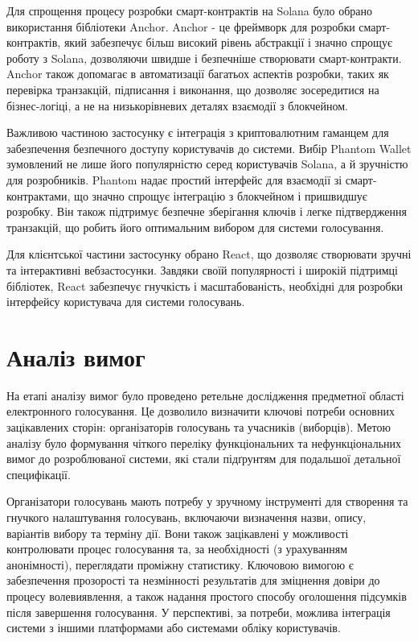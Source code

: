 \documentclass[14pt]{extreport}
\begin{document}
  Для спрощення процесу розробки смарт-контрактів на Solana було обрано використання бібліотеки Anchor. Anchor - це фреймворк для розробки смарт-контрактів, який забезпечує більш високий рівень абстракції і значно спрощує роботу з Solana, дозволяючи швидше і безпечніше створювати смарт-контракти. Anchor також допомагає в автоматизації багатьох аспектів розробки, таких як перевірка транзакцій, підписання і виконання, що дозволяє зосередитися на бізнес-логіці, а не на низькорівневих деталях взаємодії з блокчейном.

  Важливою частиною застосунку є інтеграція з криптовалютним гаманцем для забезпечення безпечного доступу користувачів до системи. Вибір Phantom Wallet зумовлений не лише його популярністю серед користувачів Solana, а й зручністю для розробників. Phantom надає простий інтерфейс для взаємодії зі смарт-контрактами, що значно спрощує інтеграцію з блокчейном і пришвидшує розробку. Він також підтримує безпечне зберігання ключів і легке підтвердження транзакцій, що робить його оптимальним вибором для системи голосування.

  Для клієнтської частини застосунку обрано React, що дозволяє створювати зручні та інтерактивні вебзастосунки. Завдяки своїй популярності і широкій підтримці бібліотек, React забезпечує гнучкість і масштабованість, необхідні для розробки інтерфейсу користувача для системи голосувань.
  
  \section{Аналіз вимог}
  
  На етапі аналізу вимог було проведено ретельне дослідження предметної області електронного голосування. Це дозволило визначити ключові потреби основних зацікавлених сторін: організаторів голосувань та учасників (виборців). Метою аналізу було формування чіткого переліку функціональних та нефункціональних вимог до розроблюваної системи, які стали підґрунтям для подальшої детальної специфікації.
  
  Організатори голосувань мають потребу у зручному інструменті для створення та гнучкого налаштування голосувань, включаючи визначення назви, опису, варіантів вибору та терміну дії. Вони також зацікавлені у можливості контролювати процес голосування та, за необхідності (з урахуванням анонімності), переглядати проміжну статистику. Ключовою вимогою є забезпечення прозорості та незмінності результатів для зміцнення довіри до процесу волевиявлення, а також надання простого способу оголошення підсумків після завершення голосування. У перспективі, за потреби, можлива інтеграція системи з іншими платформами або системами обліку користувачів.
  
\end{document}
